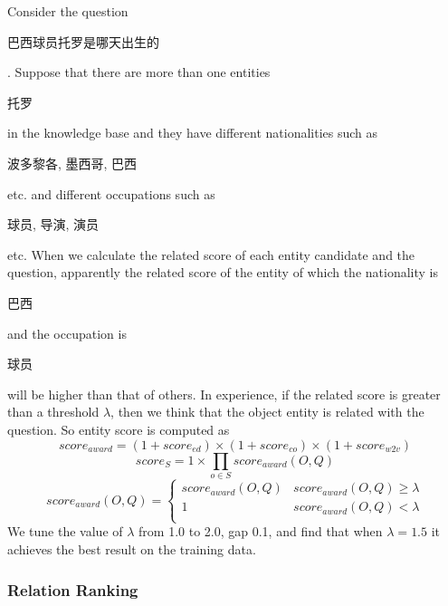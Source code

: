 \documentclass{llncs}
\begin{document}
Consider the question \begin{CJK}{UTF8}{gbsn}
巴西球员托罗是哪天出生的
\end{CJK}. Suppose that there are more than one entities \begin{CJK}{UTF8}{gbsn}
托罗
\end{CJK} in the knowledge base and they have different nationalities such as 
\begin{CJK}{UTF8}{gbsn}
波多黎各, 墨西哥, 巴西
\end{CJK} etc. and different occupations such as \begin{CJK}{UTF8}{gbsn}
球员, 导演, 演员
\end{CJK} etc. When we calculate the related score of each entity candidate and 
the question, apparently the related score of the entity of which the nationality
is \begin{CJK}{UTF8}{gbsn}
巴西
\end{CJK} and the occupation is \begin{CJK}{UTF8}{gbsn}
球员
\end{CJK} will be higher than that of others. In experience, 
if the related score is greater than a threshold $\lambda$, then we think that the object entity 
is related with the question. So entity score is computed as
\begin{equation}
    score_{award} = (1+score_{ed}) \times (1+score_{co}) \times (1+score_{w2v})
  \end{equation}
\begin{equation}
    score_{S} =  1 \times \prod_{o \in S}{score_{award}(O, Q)}
  \end{equation}
\begin{equation}
    score_{award}(O, Q) = \begin{cases} 
                          score_{award}(O, Q) & score_{award}(O, Q) \geq \lambda \\
                          1 & score_{award}(O, Q) < \lambda \\
                          \end{cases}
  \end{equation}
We tune the value of $\lambda$ from 1.0 to 2.0, gap 0.1, and find that when 
$\lambda = 1.5$ it achieves the best result on the training data.


\subsubsection{Relation Ranking}
\end{document}
